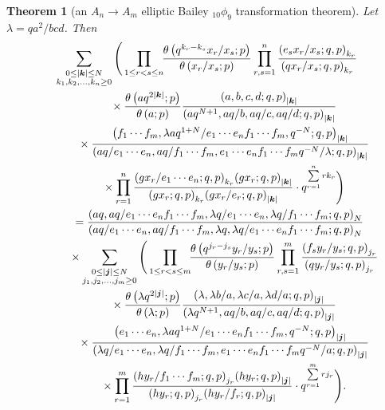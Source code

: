 \documentclass[pdftex]{sigma}
\numberwithin{equation}{section}
\newtheorem{Theorem}{Theorem}[section]
\newcommand\sumj{{\left| \boldsymbol {j} \right|}}
\newcommand\sumk{{\left| \boldsymbol{k} \right|}}
\newcommand{\triprod}[1]{\prod\limits_{1\le r < s \le #1}}
\newcommand{\sqprod}[1]{\prod\limits_{r, s =1}^{#1}} %
\newcommand{\smallprod}[1]{\prod\limits_{r =1}^{#1}} %
\newcommand{\xover}[1]{#1_{r}/#1_{s}}
\newcommand{\ellipticqrfac}[2]{{\left({#1}; q, p\right)_{#2}}} %
\newcommand{\elliptictheta}[1]{\theta \left({#1} ; p\right) }
\newcommand{\ellipticvandermonde}[3]{\triprod{#3} %
\!\! \frac{\elliptictheta{q^{#2_r-#2_s} \xover {#1} }}{\elliptictheta{\xover{#1}}}
}
\begin{document}
\begin{Theorem}[an $A_n\to A_m$ elliptic Bailey $_{10}\phi_9$ transformation theorem] \label{th:e-10p9-7-n-m-tetra} Let $\lambda = qa^2/bcd$. Then
\begin{gather}
\sum\limits_{\substack{0\leq \sumk\leq N \\
k_1,k_2, \dots, k_n\geq 0} } \Bigg( \ellipticvandermonde{x}{k}{n}
\sqprod n \frac{\ellipticqrfac{e_s\xover{x}}{k_r} }{\ellipticqrfac{q\xover{x}}{k_r} } \notag \\
\qquad\quad{} \times
\frac{\elliptictheta{a q^{2\sumk}}}{\elliptictheta{a }}
\frac{\ellipticqrfac{a, b, c, d}{\sumk}}
{\ellipticqrfac{ a q^{N+1}, a q/b, aq/c, aq/d}{\sumk}}\nonumber\\
\qquad\quad{} \times
\frac{\ellipticqrfac{f_1\cdots f_m, \lambda aq^{1+N}/e_1\cdots e_n f_1\cdots f_m, q^{-N}}{\sumk}}
{\ellipticqrfac{a q/e_1\cdots e_n, aq/f_1\cdots f_m,
e_1\cdots e_n f_1\cdots f_m q^{-N}/\lambda}{\sumk}}\nonumber\\
\qquad\quad{} \times
\smallprod n \frac{\ellipticqrfac{g x_r/e_1\cdots e_n}{k_r}
\ellipticqrfac{g x_r}{\sumk}}{\ellipticqrfac{g x_r}{k_r} \ellipticqrfac{g x_r/e_r}{\sumk} } \cdot q^{\sum\limits_{r=1}^n rk_r} \Bigg)
\notag \\
\qquad{}= \frac{\ellipticqrfac{aq, aq/e_1\cdots e_n f_1\cdots f_m, \lambda q/e_1\cdots e_n, \lambda q/f_1\cdots f_m}{N}}{\ellipticqrfac{ a q/e_1\cdots e_n , aq/f_1\cdots f_m, \lambda q,
\lambda q/e_1\cdots e_n f_1\cdots f_m}{N}}\notag \\
\qquad\quad{} \times \sum\limits_{\substack{0\leq \sumj\leq N \\ j_1,j_2, \dots, j_m\geq 0} } \Bigg( \ellipticvandermonde{y}{j}{m}
\sqprod m \frac{\ellipticqrfac{f_s\xover{y}}{j_r} }{\ellipticqrfac{q\xover{y}}{j_r} } \notag \\
\qquad\quad{} \times \frac{\elliptictheta{\lambda q^{2\sumj}}}{\elliptictheta{\lambda }}
\frac{\ellipticqrfac{\lambda , \lambda b/a, \lambda c/a , \lambda d/a}{\sumj}}
{\ellipticqrfac{ \lambda q^{N+1}, a q/b, aq/c, aq/d}{\sumj}}\nonumber\\
\qquad\quad{} \times \frac{\ellipticqrfac{e_1\cdots e_n,
\lambda aq^{1+N}/e_1\cdots e_n f_1\cdots f_m, q^{-N}}{\sumj}}
{\ellipticqrfac{ \lambda q/e_1\cdots e_n, \lambda q/f_1\cdots f_m,
e_1\cdots e_n f_1\cdots f_m q^{-N}/a}{\sumj}}\nonumber\\
\qquad\quad{} \times \smallprod m \frac{\ellipticqrfac{h y_r/f_1\cdots f_m}{j_r}
\ellipticqrfac{h y_r}{\sumj}} {\ellipticqrfac{h y_r}{j_r} \ellipticqrfac{h y_r/f_r}{\sumj} }\cdot
 q^{\sum\limits_{r=1}^m rj_r} \Bigg). \label{e-10p9-7-n-m-tetra}
\end{gather}
\end{Theorem}
\end{document}
